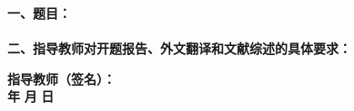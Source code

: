 
\newpage
\thispagestyle{empty}

\begin{tabbing}
\hspace{5mm}\songti\sihao \textbf{一、题目：}\underline{\makebox[12cm]{\zjutitlec}}
\\ \\
\hspace{5mm}\songti\sihao \textbf{二、指导教师对开题报告、外文翻译和文献综述的具体要求：}
\end{tabbing}

\vspace{100mm}

\begin{tabbing}
\hspace{80mm}\songti\xiaosi \textbf{指导教师（签名）：}
\\ \hspace{90mm} \songti\xiaosi \textbf{年} \hspace{5mm} \songti\xiaosi \textbf{月} \hspace{5mm} \songti\xiaosi \textbf{日}
\end{tabbing}

